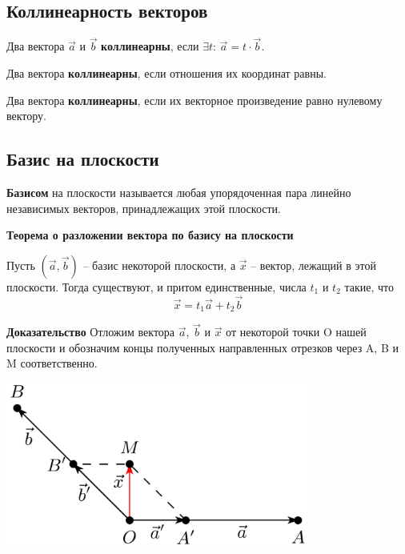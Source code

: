 \documentclass[a4paper]{article}
\begin{document}
    \newpage \begin{center}
                 \begin{Large}
                 \end{Large}
    \end{center}
    \subsection*{Коллинеарность векторов}
    Два вектора $\vec{a}$ и $\vec{b}$ \textbf{коллинеарны}, если $\exists t$: $\vec{a} = t \cdot \vec{b}$.

    Два вектора \textbf{коллинеарны}, если отношения их координат равны.

    Два вектора \textbf{коллинеарны}, если их векторное произведение равно нулевому вектору.


    \newpage \begin{center}
                 \begin{Large}
                 \end{Large}
    \end{center}
    \subsection*{Базис на плоскости}
    \textbf{Базисом} на плоскости называется любая упорядоченная пара линейно независимых векторов, принадлежащих этой плоскости.


    \begin{htheorem}
        \textbf{Теорема о разложении вектора по базису на плоскости}

        Пусть $(\vec{a},\vec{b})$ – базис некоторой плоскости, а $\vec{x}$ – вектор, лежащий в этой
        плоскости. Тогда существуют, и притом единственные, числа $t_1$ и $t_2$ такие,
        что
        \begin{equation}
            \vec{x} = t_1 \vec{a} + t_2 \vec{b}
        \end{equation}

    \end{htheorem}


    \textbf{Доказательство}
    Отложим вектора $\vec{a}$, $\vec{b}$ и $\vec{x}$ от некоторой точки O нашей
    плоскости и обозначим концы полученных направленных отрезков через A, B и M соответственно.

    \includegraphics[width=10cm]{t1}
\end{document}
